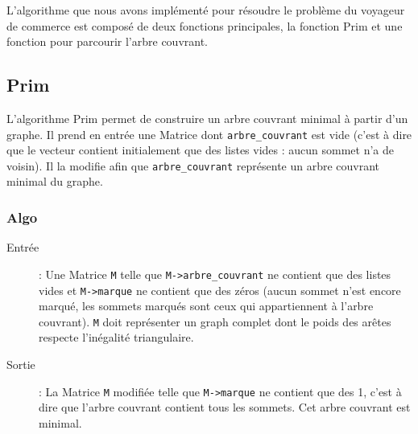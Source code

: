\documentclass[a4paper,11pt]{article}
\begin{document}
L'algorithme que nous avons implémenté pour résoudre le problème du voyageur de commerce est composé de deux fonctions principales, la fonction Prim et une fonction pour parcourir l'arbre couvrant.\\

\subsection{Prim} %

L'algorithme Prim permet de construire un arbre couvrant minimal à partir d'un graphe. Il prend en entrée une \textsf{Matrice} dont \texttt{arbre\_couvrant} est vide (c'est à dire que le vecteur contient initialement que des listes vides : aucun sommet n'a de voisin). Il la modifie afin que \texttt{arbre\_couvrant} représente un arbre couvrant minimal du graphe.\\

\subsubsection*{Algo}
\begin{description}
\item[Entrée] : Une Matrice \texttt{M} telle que \texttt{M->arbre\_couvrant} ne contient que des listes vides et \texttt{M->marque} ne contient que des zéros (aucun sommet n'est encore marqué, les sommets marqués sont ceux qui appartiennent à l'arbre couvrant). \texttt{M} doit représenter un graph complet dont le poids des arêtes respecte l'inégalité triangulaire.
\item[Sortie] : La Matrice \texttt{M} modifiée telle que \texttt{M->marque} ne contient que des 1, c'est à dire que l'arbre couvrant contient tous les sommets. Cet arbre couvrant est minimal.
\end{description}
\end{document}
